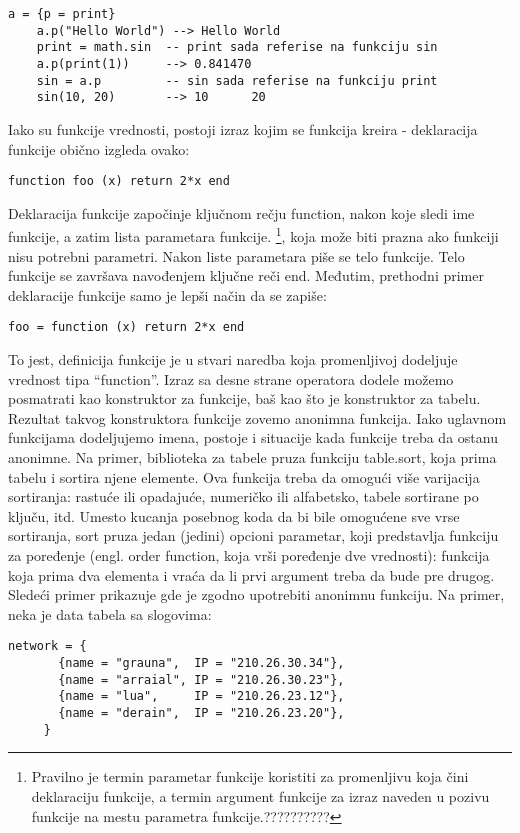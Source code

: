 \documentclass[a4paper]{article}
\begin{document}
\begin{lstlisting}[caption={Funkcije},frame=single, label=fun1]
    a = {p = print}
    a.p("Hello World") --> Hello World
    print = math.sin  -- print sada referise na funkciju sin
    a.p(print(1))     --> 0.841470
    sin = a.p         -- sin sada referise na funkciju print
	sin(10, 20)       --> 10      20
\end{lstlisting}
Iako su funkcije vrednosti, postoji izraz kojim se funkcija kreira - deklaracija funkcije obično izgleda ovako:
\begin{lstlisting}[caption={Deklaracija funkcije},frame=single, label=fun1]
    function foo (x) return 2*x end
\end{lstlisting}
Deklaracija funkcije započinje ključnom rečju function, nakon koje sledi ime funkcije, a zatim lista parametara funkcije. \footnote{Pravilno je termin parametar funkcije koristiti za promenljivu koja čini deklaraciju funkcije, a termin argument funkcije za izraz naveden u pozivu funkcije na mestu parametra funkcije.??????????}, koja može biti prazna ako funkciji nisu potrebni parametri. Nakon liste parametara piše se telo funkcije. Telo funkcije se završava navođenjem ključne reči end.
Međutim, prethodni primer deklaracije funkcije samo je lepši način da se zapiše:
\begin{lstlisting}[caption={Dodela vrednosti tipa function promenljivoj foo},frame=single, label=fun1]
    foo = function (x) return 2*x end
\end{lstlisting}
To jest, definicija funkcije je u stvari naredba koja promenljivoj dodeljuje vrednost tipa “function”. Izraz sa desne strane operatora dodele možemo posmatrati kao konstruktor za funkcije, baš kao što je {} konstruktor za tabelu. Rezultat takvog konstruktora funkcije zovemo anonimna funkcija. Iako uglavnom funkcijama dodeljujemo imena, postoje i situacije kada funkcije treba da ostanu anonimne. Na primer, biblioteka za tabele pruza funkciju table.sort, koja prima tabelu i sortira njene elemente. Ova funkcija treba da omogući više varijacija sortiranja: rastuće ili opadajuće, numeričko ili alfabetsko, tabele sortirane po ključu, itd. Umesto kucanja posebnog koda da bi bile omogućene sve vrse sortiranja, sort pruza jedan (jedini) opcioni parametar, koji predstavlja funkciju za poređenje (engl. order function, koja vrši poređenje dve vrednosti): funkcija koja prima dva elementa i vraća da li prvi argument treba da bude pre drugog. Sledeći primer prikazuje gde je zgodno upotrebiti anonimnu funkciju. Na primer, neka je data tabela sa slogovima:
\begin{lstlisting}[caption={Primer tabele},frame=single, label=fun2]
     network = {
       {name = "grauna",  IP = "210.26.30.34"},
       {name = "arraial", IP = "210.26.30.23"},
       {name = "lua",     IP = "210.26.23.12"},
       {name = "derain",  IP = "210.26.23.20"},
     }
\end{lstlisting}
\end{document}
